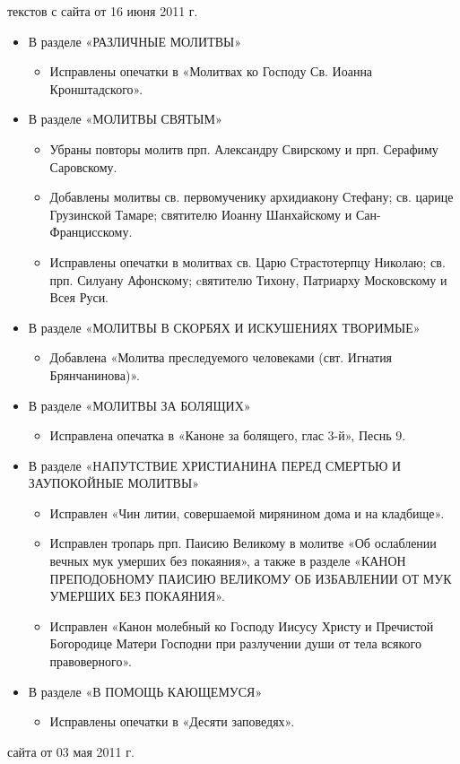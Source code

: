 { текстов с сайта от 16 июня 2011 г.
\begin{itemize}

\item В разделе «РАЗЛИЧНЫЕ МОЛИТВЫ»
\begin{itemize}
\item Исправлены опечатки в «Молитвах ко Господу Св. Иоанна Кронштадского».
\end{itemize}

\item В разделе «МОЛИТВЫ СВЯТЫМ»
\begin{itemize}
\item Убраны повторы молитв прп. Александру Свирскому и прп. Серафиму Саровскому.
\item Добавлены молитвы св. первомученику архидиакону Стефану; св. царице Грузинской Тамаре; святителю Иоанну Шанхайскому и Сан-Францисскому.
\item Исправлены опечатки в молитвах св. Царю Страстотерпцу Николаю; св. прп. Силуану Афонскому; cвятителю Тихону, Патриарху Московскому и Всея Руси.
\end{itemize}

\item В разделе «МОЛИТВЫ В СКОРБЯХ И ИСКУШЕНИЯХ ТВОРИМЫЕ»
\begin{itemize}
\item Добавлена «Молитва преследуемого человеками (свт. Игнатия Брянчанинова)».
\end{itemize}

\item В разделе «МОЛИТВЫ ЗА БОЛЯЩИХ»
\begin{itemize}
\item Исправлена опечатка в «Каноне за болящего, глас 3-й», Песнь 9.
\end{itemize}

\item В разделе «НАПУТСТВИЕ ХРИСТИАНИНА ПЕРЕД СМЕРТЬЮ И ЗАУПОКОЙНЫЕ МОЛИТВЫ»
\begin{itemize}
\item Исправлен «Чин литии, совершаемой мирянином дома и на кладбище».
\item Исправлен тропарь прп. Паисию Великому в молитве «Об ослаблении вечных мук умерших без покаяния», а также в разделе «КАНОН ПРЕПОДОБНОМУ ПАИСИЮ ВЕЛИКОМУ ОБ ИЗБАВЛЕНИИ ОТ МУК УМЕРШИХ БЕЗ ПОКАЯНИЯ».
\item Исправлен «Канон молебный ко Господу Иисусу Христу и Пречистой Богородице Матери Господни при разлучении души от тела всякого правоверного».
\end{itemize}

\item В разделе «В ПОМОЩЬ КАЮЩЕМУСЯ»
\begin{itemize}
\item Исправлены опечатки в «Десяти заповедях».
\end{itemize}


\end{itemize}}



{ сайта от 03 мая 2011 г.}

\mychapterending

